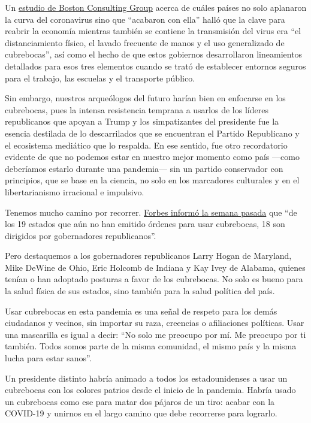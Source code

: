 Un
\href{https://www.bcg.com/publications/2020/why-its-not-too-late-to-contain-the-virus}{estudio
de Boston Consulting Group} acerca de cuáles países no solo aplanaron la
curva del coronavirus sino que ``acabaron con ella'' halló que la clave
para reabrir la economía mientras también se contiene la transmisión del
virus era ``el distanciamiento físico, el lavado frecuente de manos y el
uso generalizado de cubrebocas'', así como el hecho de que estos
gobiernos desarrollaron lineamientos detallados para esos tres elementos
cuando se trató de establecer entornos seguros para el trabajo, las
escuelas y el transporte público.

Sin embargo, nuestros arqueólogos del futuro harían bien en enfocarse en
los cubrebocas, pues la intensa resistencia temprana a usarlos de los
líderes republicanos que apoyan a Trump y los simpatizantes del
presidente fue la esencia destilada de lo descarrilados que se
encuentran el Partido Republicano y el ecosistema mediático que lo
respalda. En ese sentido, fue otro recordatorio evidente de que no
podemos estar en nuestro mejor momento como país ---como deberíamos
estarlo durante una pandemia--- sin un partido conservador con
principios, que se base en la ciencia, no solo en los marcadores
culturales y en el libertarianismo irracional e impulsivo.

Tenemos mucho camino por recorrer.
\href{https://www.forbes.com/sites/jackbrewster/2020/07/24/19-states-still-dont-mandate-masks-18-are-run-by-republican-governors/\#4b5e331d6243}{Forbes
informó la semana pasada} que ``de los 19 estados que aún no han emitido
órdenes para usar cubrebocas, 18 son dirigidos por gobernadores
republicanos''.

Pero destaquemos a los gobernadores republicanos Larry Hogan de
Maryland, Mike DeWine de Ohio, Eric Holcomb de Indiana y Kay Ivey de
Alabama, quienes tenían o han adoptado posturas a favor de los
cubrebocas. No solo es bueno para la salud física de sus estados, sino
también para la salud política del país.

Usar cubrebocas en esta pandemia es una señal de respeto para los demás
ciudadanos y vecinos, sin importar su raza, creencias o afiliaciones
políticas. Usar una mascarilla es igual a decir: ``No solo me preocupo
por mí. Me preocupo por ti también. Todos somos parte de la misma
comunidad, el mismo país y la misma lucha para estar sanos''.

Un presidente distinto habría animado a todos los estadounidenses a usar
un cubrebocas con los colores patrios desde el inicio de la pandemia.
Habría usado un cubrebocas como ese para matar dos pájaros de un tiro:
acabar con la COVID-19 y unirnos en el largo camino que debe recorrerse
para lograrlo.

